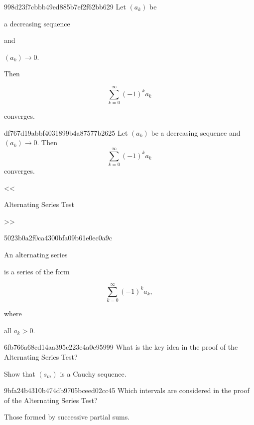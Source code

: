 \begin{note}{998d23f7cbbb49ed885b7ef2f62bb629}
    Let \({ (a_k) }\) be \begin{icloze}{4}a decreasing sequence\end{icloze} and \begin{icloze}{3}\({ (a_k) \to 0 }\).\end{icloze}
    Then
    \begin{icloze}{2}
        \[
            \sum_{k=0}^{\infty} (-1)^{k}a_k
        \]
    \end{icloze}
    \begin{icloze}{1}converges.\end{icloze}
\end{note}

\begin{note}{df767d19abbf4031899b4a87577b2625}
    Let \({ (a_k) }\) be a decreasing sequence and \({ (a_k) \to 0 }\).
    Then
    \[
        \sum_{k=0}^{\infty} (-1)^{k}a_k
    \]
    converges.

    \begin{center}
        \tiny
        <<\begin{icloze}{1}Alternating Series Test\end{icloze}>>
    \end{center}
\end{note}

\begin{note}{5023b0a2f0ca4300bfa09b61e0ec0a9c}
    \begin{icloze}{1}An alternating series\end{icloze} is a series of the form
    \begin{icloze}{2}
        \[
            \sum_{k=0}^{\infty} (-1)^{k}a_k,
        \]
    \end{icloze}
    where \begin{icloze}{3}all \({ a_k > 0 }\).\end{icloze}
\end{note}

\begin{note}{6fb766a68cd14aa395c223e4a0e95999}
    What is the key idea in the proof of the Alternating Series Test?

    \begin{cloze}{1}
        Show that \({ (s_m) }\) is a Cauchy sequence.
    \end{cloze}
\end{note}

\begin{note}{9bfa24b4310b474db9705bceed02cc45}
    Which intervals are considered in the proof of the Alternating Series Test?

    \begin{cloze}{1}
        Those formed by successive partial sums.
    \end{cloze}
\end{note}

